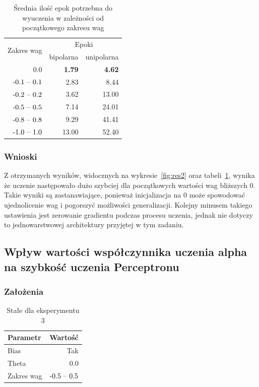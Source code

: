 \documentclass{article}
\begin{document}
\begin{table}[!h]
	\caption{Średnia ilość epok potrzebna do wyuczenia w zależności od początkowego zakresu wag}
	\label{tabela-res-2}
	\centering
	\begin{tabular}{rrr}
		\toprule
		\multirow{2}{*}{Zakres wag}   & \multicolumn{2}{c}{Epoki} \\
		                  & bipolarna     & unipolarna    \\
		\midrule
		0.0               & \textbf{1.79} & \textbf{4.62} \\
		\($-0.1 -- 0.1$\) & 2.83          & 8.44          \\
		\($-0.2 -- 0.2$\) & 3.62          & 13.00         \\
		\($-0.5 -- 0.5$\) & 7.14          & 24.01         \\
		\($-0.8 -- 0.8$\) & 9.29          & 41.41         \\
		\($-1.0 -- 1.0$\) & 13.00         & 52.40         \\
		\bottomrule
	\end{tabular}
\end{table}

\subsubsection*{Wnioski}

Z otrzymanych wyników, widocznych na wykresie~\ref{fig:res2} oraz tabeli~\ref{tabela-res-2}, wynika że uczenie następowało dużo szybciej dla początkowych wartości wag bliższych 0. Takie wyniki są zastanawiające, ponieważ inicjalizacja na 0 może spowodować ujednolicenie wag i pogorszyć możliwości generalizacji. Kolejny  minusem takiego ustawienia jest zerowanie gradientu podczas procesu uczenia, jednak nie dotyczy to jednowarstwowej architektury przyjętej w tym zadaniu. 

\newpage
\subsection{Wpływ wartości współczynnika uczenia alpha na szybkość uczenia Perceptronu}
\subsubsection*{Założenia}

\begin{table}[!h]
	\caption{Stałe dla eksperymentu 3}
	\label{tabela-const-3}
	\centering
	\begin{tabular}{lr}
		\toprule
		Parametr   & Wartość         \\
		\midrule
		Bias       & Tak               \\
		Theta      & 0.0               \\
		Zakres wag & \($-0.5 -- 0.5$\) \\
		\bottomrule
	\end{tabular}
\end{table}
\end{document}
